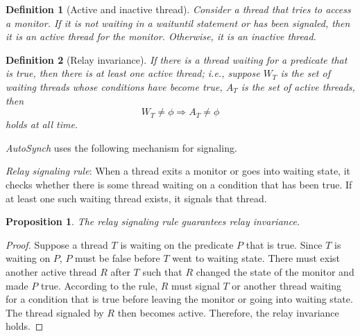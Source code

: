 \documentclass{sigplanconf}
\newtheorem{definition}{Definition}
\newtheorem{proposition}{Proposition}
\begin{document}
\begin{definition}[Active and inactive thread] 
    Consider a thread that tries to access a monitor. If it is not waiting in a
    {\em waituntil} statement or has been signaled, then it is an {\em active} 
    thread for the monitor. Otherwise, it is an {\em inactive} thread. 
\end{definition}

\begin{definition}[Relay invariance]
    If there is a thread waiting for a predicate that is true, then there is at
    least one active thread; i.e., suppose $W_T$ is the set of waiting threads
    whose conditions have become true, $A_T$ is the set of active threads,
    then
    \[
        W_T \ne \phi \Rightarrow A_T \ne \phi 
    \]
    holds at all time. 
\end{definition}

{\em AutoSynch} uses the following mechanism for signaling.

{\em Relay signaling rule}: When a thread exits a monitor or goes into waiting 
    state, it checks whether there is some thread waiting on a condition that 
    has been true. If at least one such waiting thread exists, it signals that 
    thread.
    
\begin{proposition} \label{pro:relay_signal}
     The relay signaling rule guarantees relay invariance. 
\end{proposition}
\begin{proof}
    Suppose a thread $T$ is waiting on the predicate $P$ that is true. Since 
    $T$ is waiting 
    on $P$, $P$ must be false before $T$ went to waiting state. There must 
    exist another active thread $R$ after $T$ such that $R$ changed the state 
    of the monitor and made  $P$ true. According to the rule, $R$ must signal
    $T$ or another thread waiting for a condition that is true before leaving the
    monitor or going into waiting state. The thread signaled by $R$ then
    becomes active. Therefore, the relay invariance holds. 
 
 \end{proof}
\end{document}
